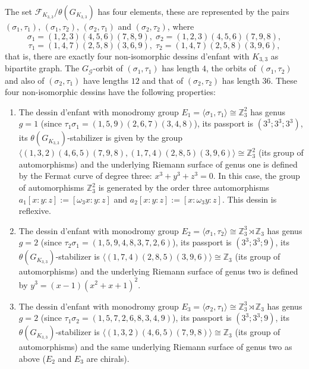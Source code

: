 \documentclass[12pt]{amsart}
\theoremstyle{remark}
\begin{document}
The set ${\mathcal F}_{K_{3,3}}/\theta(G_{K_{3,3}})$ has four elements, these are represented by the pairs
$(\sigma_{1},\tau_{1})$, $(\sigma_{1},\tau_{2})$, $(\sigma_{2},\tau_{1})$ and $(\sigma_{2},\tau_{2})$,
where
$$\sigma_{1}=(1,2,3)(4,5,6)(7,8,9), \; \sigma_{2}=(1,2,3)(4,5,6)(7,9,8),$$
$$\tau_{1}=(1,4,7)(2,5,8)(3,6,9), \; \tau_{2}=(1,4,7)(2,5,8)(3,9,6),$$
that is, there are exactly four non-isomorphic dessins d'enfant with $K_{3,3}$ as bipartite graph. The $G_{\mathcal G}$-orbit of $(\sigma_{1},\tau_{1})$ has length $4$, the orbits of $(\sigma_{1},\tau_{2})$ and also of $(\sigma_{2},\tau_{1})$ have lengths $12$ and that of $(\sigma_{2},\tau_{2})$ has length $36$.
These four non-isomorphic dessins have the following properties:
\begin{enumerate} 
\item The dessin d'enfant with monodromy group $E_{1}=\langle \sigma_{1},\tau_{1}\rangle \cong {\mathbb Z}_{3}^{2}$ has genus $g=1$ (since $\tau_{1}\sigma_{1}=(1,5,9)(2,6,7)(3,4,8)$), its passport is
$(3^3;3^3;3^3)$, its 
$\theta(G_{K_{3,3}})$-stabilizer is given by the group $\langle (1,3,2)(4,6,5)(7,9,8), (1,7,4)(2,8,5)(3,9,6) \rangle \cong {\mathbb Z}_{3}^{2}$ (its group of automorphisms)
and the underlying Riemann surface of genus one is defined by the Fermat curve of degree three: $x^{3}+y^{3}+z^{3}=0$. In this case, the group of automorphisms ${\mathbb Z}_{3}^{2}$ is generated by the order three automorphisms
$a_{1}[x:y:z]:=[\omega_{3}x:y:z]$ and $a_{2}[x:y:z]:=[x:\omega_{3}y:z]$. This dessin is reflexive.

\item The dessin d'enfant with monodromy group $E_{2}=\langle \sigma_{1},\tau_{2}\rangle \cong {\mathbb Z}_{3}^{3} \rtimes {\mathbb Z}_{3}$ has genus  $g=2$ (since $\tau_{2}\sigma_{1}=(1,5,9,4,8,3,7,2,6)$), its passport is $(3^3;3^3;9)$, its 
$\theta(G_{K_{3,3}})$-stabilizer is $\langle (1,7,4)(2,8,5)(3,9,6) \rangle \cong {\mathbb Z}_{3}$ (its group of automorphisms) and the underlying Riemann surface of genus two is defined by $y^{3}=(x-1)(x^2+x+1)^{2}$.

\item The dessin d'enfant with monodromy group $E_{3}=\langle \sigma_{2},\tau_{1}\rangle \cong {\mathbb Z}_{3}^{3} \rtimes {\mathbb Z}_{3}$ has genus $g=2$ (since $\tau_{1}\sigma_{2}=(1,5,7,2,6,8,3,4,9)$), its passport is $(3^3;3^3;9)$, its 
$\theta(G_{K_{3,3}})$-stabilizer is $\langle (1,3,2)(4,6,5)(7,9,8) \rangle \cong   {\mathbb Z}_{3}$ (its group of automorphisms) and the same underlying Riemann surface of genus two as above ($E_{2}$ and $E_{3}$ are chirals). 


\end{enumerate}
\end{document}
